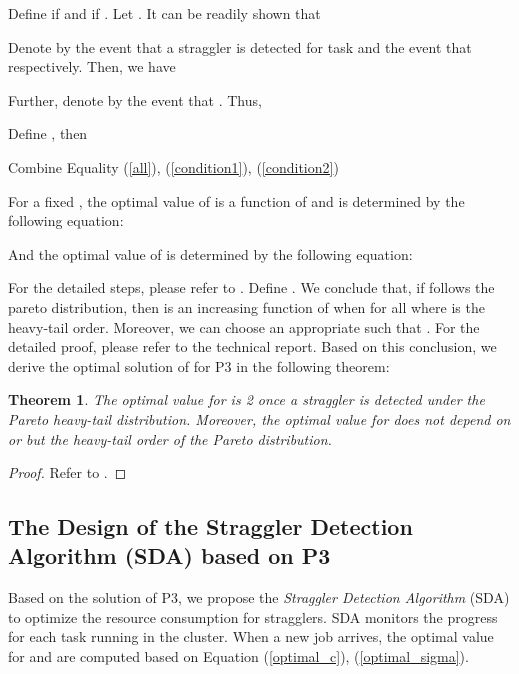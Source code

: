 \documentclass[10pt,conference]{IEEEtran}
\newtheorem{Theorem}{Theorem}
\begin{document}
Define  if  and  if .  Let . It can be readily shown that

Denote by  the event that a straggler is detected for task  and  the event that  respectively. Then, we have

Further, denote by    the event that . Thus,


Define , then

Combine Equality (\ref{all}), (\ref{condition1}), (\ref{condition2})

For a fixed , the optimal value of  is a function of  and is determined by the following equation:

And the optimal value of  is determined by the following equation:

For the detailed steps, please refer to \cite{speculative-multi-job}.
Define . We conclude that, if  follows the pareto distribution, then  is an increasing function of  when  for all  where  is the heavy-tail order. Moreover, we can choose an appropriate  such that . For the detailed proof, please refer to the technical report. Based on this conclusion, we derive the optimal solution of  for P3 in the following theorem:
\begin{Theorem}
\label{Theorem 2}
The optimal value for  is 2 once a straggler is detected under the Pareto heavy-tail distribution. Moreover, the optimal value for  does not depend on  or   but  the heavy-tail order of the Pareto distribution.
\label{optimal_c_i_j}
\end{Theorem}
\begin{proof}
Refer to \cite{speculative-multi-job}.
\end{proof}


\subsection{The Design of  the Straggler Detection Algorithm (SDA) based on P3}
Based on the solution of P3, we propose the \textit{Straggler Detection Algorithm} (SDA) to optimize the resource consumption for stragglers. SDA monitors the progress for each task running in the cluster. When a new job  arrives, the optimal value for  and  are computed based on Equation (\ref{optimal_c}), (\ref{optimal_sigma}).
\end{document}
